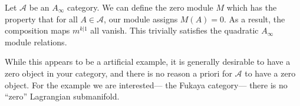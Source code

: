 
Let $\mathcal A$ be an $A_\infty$ category. We can define the zero module $M$ which has the property that for all $A\in \mathcal A$, our module assigns $M(A)=0$. As a result, the composition maps $m^{k|1}$ all vanish. This trivially satisfies the quadratic $A_\infty$ module relations.

While this appears to be a artificial example, it is generally desirable to have a zero object in your category, and there is no reason a priori for $\mathcal A$ to have a zero object. For the example we are interested--- the Fukaya category--- there is no ``zero'' Lagrangian submanifold.
